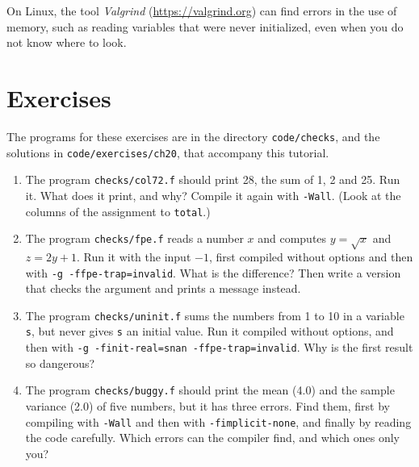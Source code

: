 On Linux, the tool \emph{Valgrind} (\url{https://valgrind.org}) can find errors in the use of memory, such as reading variables that were never initialized, even when you do not know where to look.

\section{Exercises}

The programs for these exercises are in the directory \texttt{code/checks}, and the solutions in \texttt{code/exercises/ch20}, that accompany this tutorial.

\begin{enumerate}
    \item The program \texttt{checks/col72.f} should print 28, the sum of 1, 2 and 25. Run it. What does it print, and why? Compile it again with \texttt{-Wall}. (Look at the columns of the assignment to \texttt{total}.)
    \item The program \texttt{checks/fpe.f} reads a number $x$ and computes $y = \sqrt{x}$ and $z = 2y + 1$. Run it with the input $-1$, first compiled without options and then with \texttt{-g -ffpe-trap=invalid}. What is the difference? Then write a version that checks the argument and prints a message instead.
    \item The program \texttt{checks/uninit.f} sums the numbers from 1 to 10 in a variable \texttt{s}, but never gives \texttt{s} an initial value. Run it compiled without options, and then with \texttt{-g -finit-real=snan -ffpe-trap=invalid}. Why is the first result so dangerous?
    \item The program \texttt{checks/buggy.f} should print the mean (4.0) and the sample variance (2.0) of five numbers, but it has three errors. Find them, first by compiling with \texttt{-Wall} and then with \texttt{-fimplicit-none}, and finally by reading the code carefully. Which errors can the compiler find, and which ones only you?
\end{enumerate}
